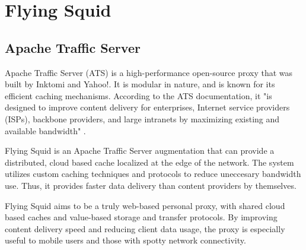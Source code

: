 \section{Flying Squid}

\subsection{Apache Traffic Server}

Apache Traffic Server (ATS) is a high-performance open-source proxy that was built by Inktomi and Yahoo!. It is modular in nature, and is known for its efficient caching mechanisms. According to the ATS documentation, it "is designed to improve content delivery for enterprises, Internet service providers (ISPs), backbone providers, and large intranets by maximizing existing and available bandwidth" \cite{ATS}.

Flying Squid is an Apache Traffic Server augmentation that can provide a distributed, cloud based cache localized at the edge of the network. The system utilizes custom caching techniques and protocols to reduce uneccesary bandwidth use. Thus, it provides faster data delivery than content providers by themselves. 


Flying Squid aims to be a truly web-based personal proxy, with shared cloud based caches and value-based storage and transfer protocols. By improving content delivery speed and reducing client data usage, the proxy is especially useful to mobile users and those with spotty network connectivity.